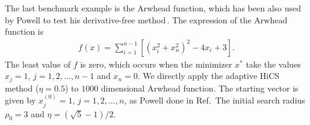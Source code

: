 \documentclass[final,1p,times]{elsarticle}
\begin{document}
%
The last benchmark example is the Arwhead function, which has been
also used by Powell to test his derivative-free
method\,\cite{powell2006newuoa}. The expression of the Arwhead function is
\begin{align}
	f(x) = \sum_{i=1}^{n-1}[(x_i^2+x_n^2)^2 - 4 x_i +3].
	\label{}
\end{align}
The least value of $f$ is zero, which occurs when the minimizer
$x^*$ take the values $x_j=1$, $j=1,2,\dots,n-1$ and $x_n=0$. 
We directly apply the adaptive HiCS method ($\eta=0.5$) to $1000$
dimensional Arwhead function.
The starting vector is given by $x_j^{(0)}=1$, $j=1,2,\dots,n$, as
Powell done in Ref.\,\cite{powell2006newuoa}
The initial search radius $\rho_0=3$ and $\eta=(\sqrt{5}-1)/2$.
\end{document}
